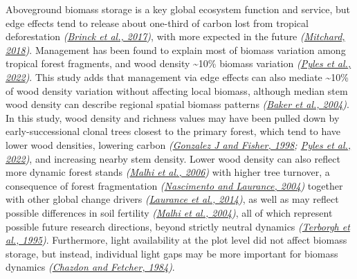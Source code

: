 \documentclass[
  12pt,
]{article}
\begin{document}
Aboveground biomass storage is a key global ecosystem function and service, but edge effects tend to release about one-third of carbon lost from tropical deforestation \emph{(\protect\hyperlink{ref-brinck17}{Brinck et al., 2017})}, with more expected in the future \emph{(\protect\hyperlink{ref-mitchard18}{Mitchard, 2018})}.
Management has been found to explain most of biomass variation among tropical forest fragments, and wood density \textasciitilde10\% biomass variation \emph{(\protect\hyperlink{ref-pyles22}{Pyles et al., 2022})}.
This study adds that management via edge effects can also mediate \textasciitilde10\% of wood density variation without affecting local biomass, although median stem wood density can describe regional spatial biomass patterns \emph{(\protect\hyperlink{ref-baker04}{Baker et al., 2004})}.
In this study, wood density and richness values may have been pulled down by early-successional clonal trees closest to the primary forest, which tend to have lower wood densities, lowering carbon \emph{(\protect\hyperlink{ref-gonzalezj98}{Gonzalez J and Fisher, 1998}; \protect\hyperlink{ref-pyles22}{Pyles et al., 2022})}, and increasing nearby stem density.
Lower wood density can also reflect more dynamic forest stands \emph{(\protect\hyperlink{ref-malhi06}{Malhi et al., 2006})} with higher tree turnover, a consequence of forest fragmentation \emph{(\protect\hyperlink{ref-nascimento04a}{Nascimento and Laurance, 2004})} together with other global change drivers \emph{(\protect\hyperlink{ref-laurance14}{Laurance et al., 2014})}, as well as may reflect possible differences in soil fertility \emph{(\protect\hyperlink{ref-malhi04}{Malhi et al., 2004})}, all of which represent possible future research directions, beyond strictly neutral dynamics \emph{(\protect\hyperlink{ref-terborgh95}{Terborgh et al., 1995})}.
Furthermore, light availability at the plot level did not affect biomass storage, but instead, individual light gaps may be more important for biomass dynamics \emph{(\protect\hyperlink{ref-chazdon84}{Chazdon and Fetcher, 1984})}.
\end{document}
